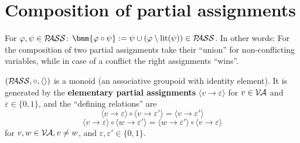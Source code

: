 \documentclass[]{book}
\begin{document}
\section{Composition of partial assignments}
\label{sec:Compositionpass}

\begin{defi}\label{def:comppass}
      For $\varphi, \psi \in \mathcal{P\hspace{-0.32em}ASS}$: $\bmm{\vp \circ \psi} := \psi \cup (\vp \sm \lit(\psi)) \in \Pass$.
      In other words: For the composition of two partial assignments take their ``union'' for non-conflicting variables, while in case of a 
	  conflict the right assignments ``wins''.
\end{defi}
\begin{lem}\label{lem:passmon}
      $(\mathcal{P\hspace{-0.32em}ASS},\circ,\langle  \rangle)$ is a monoid (an associative groupoid with identity element). It is generated by 
      the \textbf{elementary partial assignments} $\langle v\to \varepsilon\rangle$ for $v\in \mathcal{V\hspace{-0.1em}A}$ and $\varepsilon \in \{0,1\}$, and the ``defining relations'' are
      $$\langle v\to \varepsilon \rangle \circ \langle v\to \varepsilon' \rangle = \langle v\to \varepsilon' \rangle $$
      $$\langle v\to \varepsilon \rangle \circ \langle w\to \varepsilon' \rangle = \langle w\to \varepsilon' \rangle \circ \langle v\to \varepsilon \rangle$$
      for $v, w\in \mathcal{V\hspace{-0.1em}A}, v\neq w$, and $\varepsilon, \varepsilon' \in \{0, 1\}$.
\end{lem}
\end{document}
